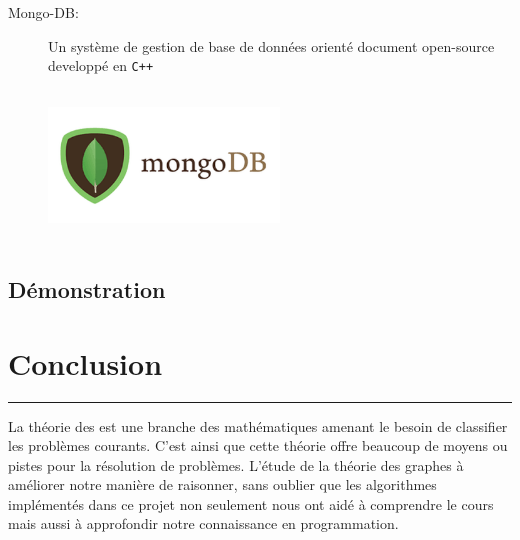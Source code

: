 \documentclass[12pt]{report}
\begin{document}
\begin{description}
		\item[\sc Mongo-DB:] Un système de gestion de base de données orienté document open-source developpé en {\tt C++}
			\begin{center}
				\includegraphics[scale=1, width=0.5\textwidth, height=4cm]{mongo}
				\label{mongo}
			\end{center}
			
		
			
	\end{description}
	
	\subsection{\sc Démonstration}
	
	

	\newpage
	\section{\sc Conclusion}
		\rule{1 \textwidth}{0.5pt} \textbf{}
		\vspace{2em}
		
		La théorie des est une branche des mathématiques amenant le besoin de classifier les problèmes courants. C'est ainsi que cette théorie offre beaucoup de moyens ou pistes pour la résolution de problèmes. L'étude de la théorie des graphes à améliorer notre manière de raisonner, sans oublier que les algorithmes implémentés dans ce projet non seulement nous ont aidé à comprendre le cours mais aussi à approfondir notre connaissance en programmation.
\end{document}
